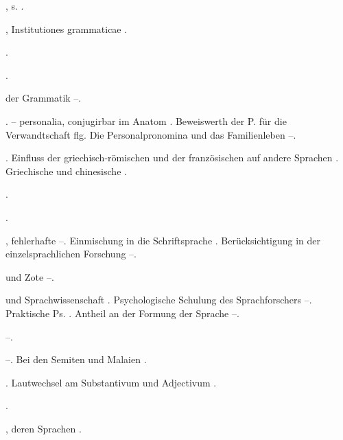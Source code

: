\begin{register}
, s. .

, Institutiones grammaticae \pageref{sp.21}.

 \pageref{sp.101}.

 \pageref{sp.348}.

 der Grammatik \pageref{sp.86}–\pageref{sp.88}.


 \pageref{sp.101}. – personalia, conjugirbar im Anatom \pageref{sp.151}. Beweiswerth der P. für die Verwandtschaft \pageref{sp.152} flg. Die Personalpronomina und das Familienleben \pageref{sp.306}–\pageref{sp.307}. 

. Einfluss der griechisch-römischen und der französischen auf andere Sprachen \pageref{sp.271}. Griechische und chinesische \pageref{sp.414}.

 \pageref{sp.114}.


 \pageref{sp.101}.

, fehlerhafte \pageref{sp.44}–\pageref{sp.45}. Einmischung in die Schriftsprache \pageref{sp.62}. Berücksichtigung in der einzelsprachlichen Forschung \pageref{sp.125}–\pageref{sp.127}.

 und Zote \pageref{sp.248}–\pageref{sp.249}.

 und Sprachwissenschaft \pageref{sp.14}. Psychologische Schulung des Sprachforschers \pageref{sp.39}–\pageref{sp.47}. Praktische Ps. \pageref{sp.47}. Antheil an der Formung der Sprache \pageref{sp.95}–\pageref{sp.96}. 

 \pageref{sp.365}–\pageref{sp.373}.


 \pageref{sp.365}–\pageref{sp.373}. Bei den Semiten und Malaien \pageref{sp.391}.

 \pageref{sp.282}. Lautwechsel am Substantivum und Adjectivum \pageref{sp.391}.

 \pageref{sp.22}.

, deren Sprachen \pageref{sp.54}.


\end{register}
